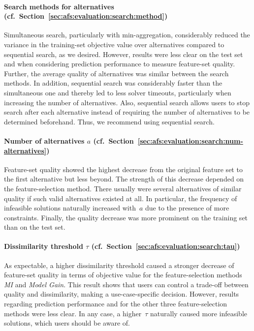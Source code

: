 \documentclass{article}
\theoremstyle{definition}
\begin{document}
\paragraph{Search methods for alternatives (cf.~Section~\ref{sec:afs:evaluation:search:method})}

Simultaneous search, particularly with min-aggregation, considerably reduced the variance in the training-set objective value over alternatives compared to sequential search, as we desired.
However, results were less clear on the test set and when considering prediction performance to measure feature-set quality.
Further, the average quality of alternatives was similar between the search methods.
In addition, sequential search was considerably faster than the simultaneous one and thereby led to less solver timeouts, particularly when increasing the number of alternatives.
Also, sequential search allows users to stop search after each alternative instead of requiring the number of alternatives to be determined beforehand.
Thus, we recommend using sequential search.

\paragraph{Number of alternatives $a$ (cf.~Section~\ref{sec:afs:evaluation:search:num-alternatives})}

Feature-set quality showed the highest decrease from the original feature set to the first alternative but less beyond.
The strength of this decrease depended on the feature-selection method.
There usually were several alternatives of similar quality if such valid alternatives existed at all.
In particular, the frequency of infeasible solutions naturally increased with~$a$ due to the presence of more constraints.
Finally, the quality decrease was more prominent on the training set than on the test set.

\paragraph{Dissimilarity threshold $\tau$ (cf.~Section~\ref{sec:afs:evaluation:search:tau})}

As expectable, a higher dissimilarity threshold caused a stronger decrease of feature-set quality in terms of objective value for the feature-selection methods \emph{MI} and \emph{Model Gain}.
This result shows that users can control a trade-off between quality and dissimilarity, making a use-case-specific decision.
However, results regarding prediction performance and for the other three feature-selection methods were less clear.
In any case, a higher~$\tau$ naturally caused more infeasible solutions, which users should be aware of.
\end{document}
